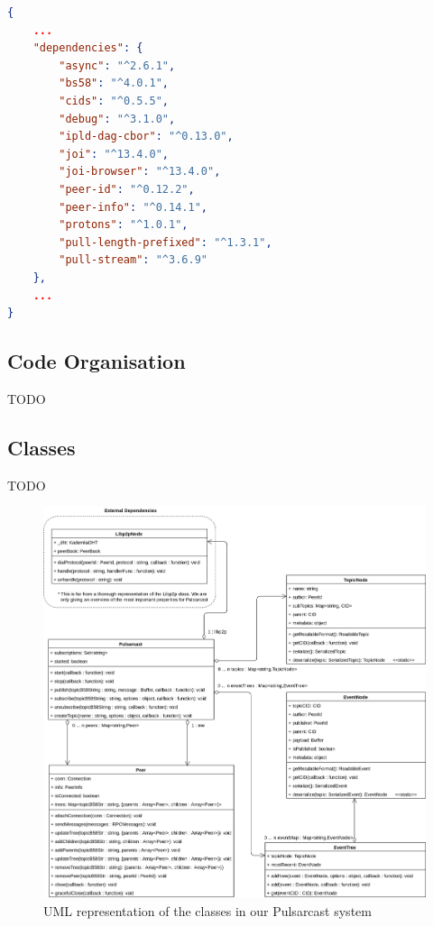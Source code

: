 \noindent\begin{minipage}{\textwidth}
\vspace{8pt}
\begin{lstlisting}[language=JSON,caption={Pulsarcast module dependency list},label={dependencies}]
{
	...
	"dependencies": {
		"async": "^2.6.1",
		"bs58": "^4.0.1",
		"cids": "^0.5.5",
		"debug": "^3.1.0",
		"ipld-dag-cbor": "^0.13.0",
		"joi": "^13.4.0",
		"joi-browser": "^13.4.0",
		"peer-id": "^0.12.2",
		"peer-info": "^0.14.1",
		"protons": "^1.0.1",
		"pull-length-prefixed": "^1.3.1",
		"pull-stream": "^3.6.9"
	},
	...
}
\end{lstlisting}
\vspace{8pt}
\end{minipage}

\subsection{Code Organisation}\label{subsec:code-organisation}

TODO

\subsection{Classes}\label{subsec:classes}

TODO

\begin{figure}[hb!]
  \center
  \includegraphics[width=1\textwidth]{img/uml-pulsarcast.png}
  \caption{UML representation of the classes in our Pulsarcast system}
  \label{fig:pulsarcast-uml}
\end{figure}

